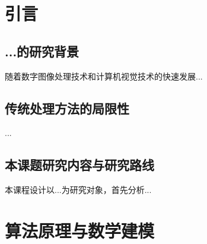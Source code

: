 \documentclass[11pt, a4paper]{article}
\begin{document}
\newpage

\tableofcontents
\newpage



\begin{abstract}
本课程设计围绕...展开研究，...
\begin{center}
Abstract
\end{center}

This course design focuses on the research of ...
\vspace{\baselineskip}
\par\textbf{关键词：} ...\\
\par\textbf{Keywords:} ...
\end{abstract}

\newpage

\section{引言}
\subsection{...的研究背景}
随着数字图像处理技术和计算机视觉技术的快速发展...
\subsection{传统处理方法的局限性}
...
\subsection{本课题研究内容与研究路线}
本课程设计以...为研究对象，首先分析...

\section{算法原理与数学建模}
\end{document}
